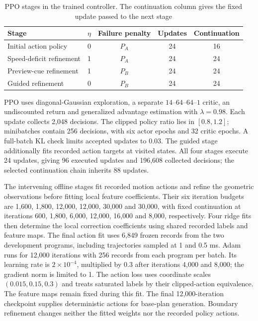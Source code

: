 \documentclass[pdflatex,sn-apa]{sn-jnl}
\begin{document}
\begin{table}[tb]
\centering
\caption{PPO stages in the trained controller. The continuation column gives the fixed update passed to the next stage}
\label{tab:frozen_ppo_stages}
\begin{tabular}{lcccc}
\hline
Stage & $\eta$ & Failure penalty & Updates & Continuation\\
\hline
Initial action policy & 0 & $P_A$ & 24 & 16\\
Speed-deficit refinement & 1 & $P_A$ & 24 & 24\\
Preview-cue refinement & 1 & $P_B$ & 24 & 24\\
Guided refinement & 0 & $P_B$ & 24 & 24\\
\hline
\end{tabular}
\end{table}

PPO uses diagonal-Gaussian exploration, a separate $14$--$64$--$64$--$1$ critic, an undiscounted return and generalized advantage estimation with $\lambda=0.98$. Each update collects 2,048 decisions. The clipped policy ratio lies in $[0.8,1.2]$; minibatches contain 256 decisions, with six actor epochs and 32 critic epochs. A full-batch KL check limits accepted updates to 0.03. The guided stage additionally fits recorded action targets at visited states. All four stages execute 24 updates, giving 96 executed updates and 196,608 collected decisions; the selected continuation chain inherits 88 updates.

The intervening offline stages fit recorded motion actions and refine the geometric observations before fitting local feature coefficients. Their six iteration budgets are 1,600, 1,800, 12,000, 12,000, 30,000 and 30,000, with fixed continuation at iterations 600, 1,800, 6,000, 12,000, 16,000 and 8,000, respectively. Four ridge fits then determine the local correction coefficients using shared recorded labels and feature maps. The final action fit uses 6,849 frozen records from the two development programs, including trajectories sampled at 1 and 0.5 ms. Adam runs for 12,000 iterations with 256 records from each program per batch. Its learning rate is $2\times10^{-4}$, multiplied by 0.3 after iterations 4,000 and 8,000; the gradient norm is limited to 1. The action loss uses coordinate scales $(0.015,0.15,0.3)$ and treats saturated labels by their clipped-action equivalence. The feature maps remain fixed during this fit. The final 12,000-iteration checkpoint supplies deterministic actions for base-plan generation. Boundary refinement changes neither the fitted weights nor the recorded policy actions.
\end{document}
